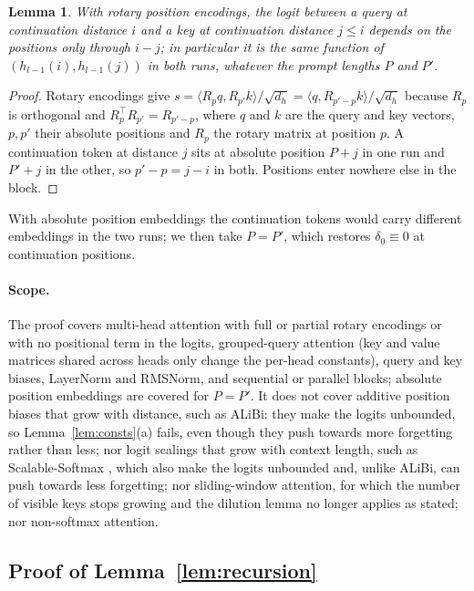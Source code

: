 \documentclass[11pt]{article}
\newtheorem{lemma}{Lemma}
\theoremstyle{definition}
\theoremstyle{remark}
\begin{document}
\begin{lemma}\label{lem:positions}
With rotary position encodings, the logit between a query at continuation distance $i$ and a key at continuation distance $j\le i$ depends on the positions only through $i-j$; in particular it is the same function of $(h_{l-1}(i),h_{l-1}(j))$ in both runs, whatever the prompt lengths $P$ and $P'$.
\end{lemma}
\begin{proof}
Rotary encodings give $s=\langle R_{p}q,R_{p'}k\rangle/\sqrt{d_h}=\langle q,R_{p'-p}k\rangle/\sqrt{d_h}$ because $R_p$ is orthogonal and $R_p^\top R_{p'}=R_{p'-p}$, where $q$ and $k$ are the query and key vectors, $p,p'$ their absolute positions and $R_p$ the rotary matrix at position $p$. A continuation token at distance $j$ sits at absolute position $P+j$ in one run and $P'+j$ in the other, so $p'-p=j-i$ in both. Positions enter nowhere else in the block.
\end{proof}

With absolute position embeddings the continuation tokens would carry different embeddings in the two runs; we then take $P=P'$, which restores $\delta_0\equiv0$ at continuation positions.

\paragraph{Scope.} The proof covers multi-head attention with full or partial rotary encodings or with no positional term in the logits, grouped-query attention (key and value matrices shared across heads only change the per-head constants), query and key biases, LayerNorm and RMSNorm, and sequential or parallel blocks; absolute position embeddings are covered for $P=P'$. It does not cover additive position biases that grow with distance, such as ALiBi: they make the logits unbounded, so Lemma~\ref{lem:consts}(a) fails, even though they push towards more forgetting rather than less; nor logit scalings that grow with context length, such as Scalable-Softmax \citep{nakanishi2025ssmax}, which also make the logits unbounded and, unlike ALiBi, can push towards less forgetting; nor sliding-window attention, for which the number of visible keys stops growing and the dilution lemma no longer applies as stated; nor non-softmax attention.

\subsection{Proof of Lemma~\ref{lem:recursion}}
\end{document}
